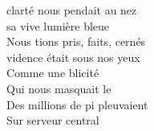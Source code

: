  clarté nous pendait au nez \\
 sa vive lumière bleue \\
Nous tions pris, faits, cernés \\
vidence était sous nos yeux \\
Comme une blicité \\
Qui nous masquait le  \\
Des millions de pi pleuvaient \\
Sur  serveur central \\
